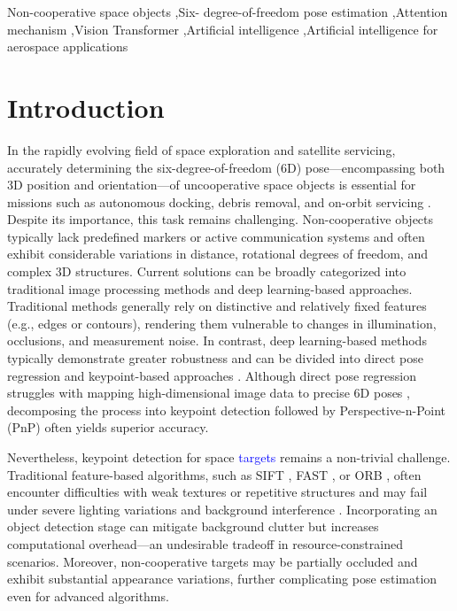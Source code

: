 \documentclass[a4paper,fleqn]{cas-sc}
\begin{document}
\begin{keywords}
Non-cooperative space objects \sep Six-
degree-of-freedom pose estimation
\sep Attention mechanism
\sep Vision Transformer
\sep Artificial intelligence
\sep Artificial intelligence for aerospace applications
\end{keywords}

\maketitle 

\section{Introduction}
In the rapidly evolving field of space exploration and satellite servicing, accurately determining the six-degree-of-freedom (6D) pose—encompassing both 3D position and orientation—of uncooperative space objects is essential for missions such as autonomous docking, debris removal, and on-orbit servicing \citep{d2014pose,modelbased_algorithm,capuano2019robust}. Despite its importance, this task remains challenging. Non-cooperative objects typically lack predefined markers or active communication systems and often exhibit considerable variations in distance, rotational degrees of freedom, and complex 3D structures. Current solutions can be broadly categorized into traditional image processing methods and deep learning-based approaches. Traditional methods generally rely on distinctive and relatively fixed features (e.g., edges or contours), rendering them vulnerable to changes in illumination, occlusions, and measurement noise. In contrast, deep learning-based methods typically demonstrate greater robustness and can be divided into direct pose regression and keypoint-based approaches \citep{huan2020pose,park2019towards,wang2022revisiting}. Although direct pose regression struggles with mapping high-dimensional image data to precise 6D poses \citep{sharma2018pose,sharma2019pose}, decomposing the process into keypoint detection followed by Perspective-n-Point (PnP) often yields superior accuracy.

Nevertheless, keypoint detection for space \textcolor{blue}{targets} remains a non-trivial challenge. Traditional feature-based algorithms, such as SIFT \citep{sift}, FAST \citep{fast}, or ORB \citep{orb}, often encounter difficulties with weak textures or repetitive structures and may fail under severe lighting variations and background interference \citep{Dai2019Comparison,bojanic2019comparison}. Incorporating an object detection stage \citep{chen2019satellite,park2019towards,black2021real,wang2022revisiting} can mitigate background clutter but increases computational overhead—an undesirable tradeoff in resource-constrained scenarios. Moreover, non-cooperative targets may be partially occluded and exhibit substantial appearance variations, further complicating pose estimation even for advanced algorithms.
\end{document}
